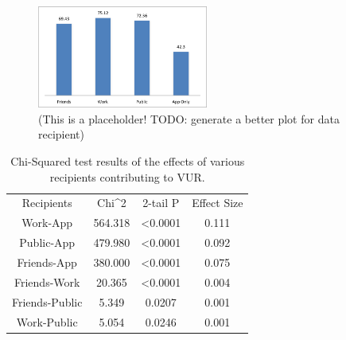 \documentclass{acm_proc_article-sp}
\begin{document}
\begin{figure}
	\centering
	\includegraphics[width=0.5\textwidth]{recipient.png}
	\caption{(This is a placeholder! TODO: generate a better plot for data recipient)}
\end{figure}


\begin{table}%
\begin{center}
\begin{tabular}{| c | c | c | c |}
Recipients	& Chi^2 &	2-tail P &  Effect Size \\
Work-App	& 564.318 & <0.0001 & 0.111\\
Public-App	& 479.980 & <0.0001 &  0.092\\
Friends-App & 380.000 & <0.0001 & 0.075\\
Friends-Work & 20.365 & <0.0001 &  0.004\\
Friends-Public & 5.349 & 0.0207 &  0.001\\
Work-Public&  5.054 & 0.0246 &  0.001\\
\end{tabular}
\caption{Chi-Squared test results of the effects of various recipients contributing to VUR.}
\label{recipient}
\end{center}
\end{table}				
						
\end{document}
